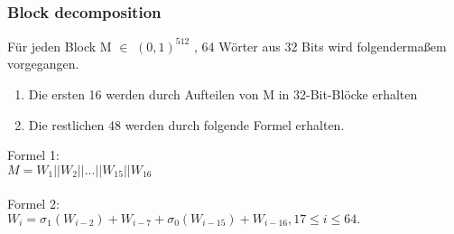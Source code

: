 {\subsubsection{Block decomposition}
\label{sec:hash_block_deco}
Für jeden Block M $\in$ $(0, 1)^{512}$ , 64 Wörter aus 32 Bits wird folgendermaßem vorgegangen. 
\begin{enumerate}
\item Die ersten 16 werden durch Aufteilen von M in 32-Bit-Blöcke erhalten
\item Die restlichen 48 werden durch folgende Formel erhalten.
\end{enumerate}
Formel 1:
\\
$M = W_1 || W_2 || ... || W_{15} || W_{16}$\\ \\
Formel 2:\\
$W_i = \sigma_1(W_{i-2}) + W_{i-7} + \sigma_0(W_{i-15}) + W_{i-16},
17 \leq  i \leq  64.$\\
}
